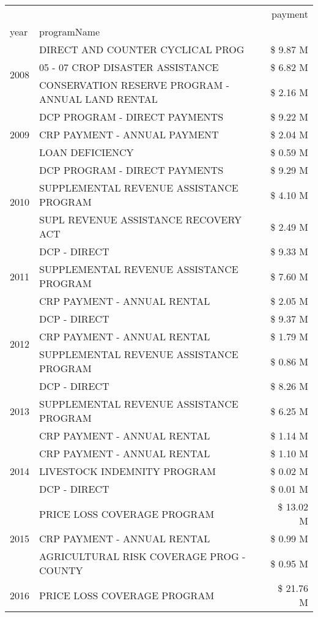 \begin{tabular}{llr}
\toprule
 &  & payment \\
year & programName &  \\
\midrule
\multirow[t]{3}{*}{2008} & DIRECT AND COUNTER CYCLICAL PROG & \$ 9.87 M \\
 & 05 - 07 CROP DISASTER ASSISTANCE & \$ 6.82 M \\
 & CONSERVATION RESERVE PROGRAM - ANNUAL LAND RENTAL & \$ 2.16 M \\
\cline{1-3}
\multirow[t]{3}{*}{2009} & DCP PROGRAM - DIRECT PAYMENTS & \$ 9.22 M \\
 & CRP PAYMENT - ANNUAL PAYMENT & \$ 2.04 M \\
 & LOAN DEFICIENCY & \$ 0.59 M \\
\cline{1-3}
\multirow[t]{3}{*}{2010} & DCP PROGRAM - DIRECT PAYMENTS & \$ 9.29 M \\
 & SUPPLEMENTAL REVENUE ASSISTANCE PROGRAM & \$ 4.10 M \\
 & SUPL REVENUE ASSISTANCE RECOVERY ACT & \$ 2.49 M \\
\cline{1-3}
\multirow[t]{3}{*}{2011} & DCP - DIRECT & \$ 9.33 M \\
 & SUPPLEMENTAL REVENUE ASSISTANCE PROGRAM & \$ 7.60 M \\
 & CRP PAYMENT - ANNUAL RENTAL & \$ 2.05 M \\
\cline{1-3}
\multirow[t]{3}{*}{2012} & DCP - DIRECT & \$ 9.37 M \\
 & CRP PAYMENT - ANNUAL RENTAL & \$ 1.79 M \\
 & SUPPLEMENTAL REVENUE ASSISTANCE PROGRAM & \$ 0.86 M \\
\cline{1-3}
\multirow[t]{3}{*}{2013} & DCP - DIRECT & \$ 8.26 M \\
 & SUPPLEMENTAL REVENUE ASSISTANCE PROGRAM & \$ 6.25 M \\
 & CRP PAYMENT - ANNUAL RENTAL & \$ 1.14 M \\
\cline{1-3}
\multirow[t]{3}{*}{2014} & CRP PAYMENT - ANNUAL RENTAL & \$ 1.10 M \\
 & LIVESTOCK INDEMNITY PROGRAM & \$ 0.02 M \\
 & DCP - DIRECT & \$ 0.01 M \\
\cline{1-3}
\multirow[t]{3}{*}{2015} & PRICE LOSS COVERAGE PROGRAM & \$ 13.02 M \\
 & CRP PAYMENT - ANNUAL RENTAL & \$ 0.99 M \\
 & AGRICULTURAL RISK COVERAGE PROG - COUNTY & \$ 0.95 M \\
\cline{1-3}
\multirow[t]{3}{*}{2016} & PRICE LOSS COVERAGE PROGRAM & \$ 21.76 M \\

\end{tabular}
